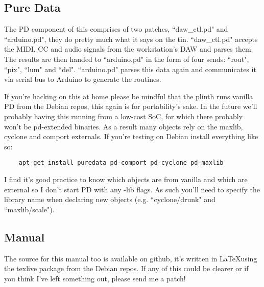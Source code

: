 \documentclass{article}
\begin{document}
	\subsection{Pure Data}
	The PD component of this comprises of two patches, ``daw\_ctl.pd" and 
	``arduino.pd", they do pretty much what it says on the tin. ``daw\_ctl.pd" 
	accepts the MIDI, CC and audio signals from the workstation's DAW and 
	parses them. The results are then handed to ``arduino.pd" in the form of 
	four sends: ``rout", ``pix", ``lum" and ``del". ``arduino.pd" parses this 
	data again and communicates it via serial bus to Arduino to generate the 
	routines.
	
	If you're hacking on this at home please be mindful that the plinth runs 
	vanilla PD from the Debian repos, this again is for portability's sake. In 
	the future we'll probably having this running from a low-cost SoC, for 
	which there probably won't be pd-extended binaries. As a result many 
	objects rely on the maxlib, cyclone and comport externals. If you're 
	testing on Debian install everything like so:
	\begin{verbatim}
	apt-get install puredata pd-comport pd-cyclone pd-maxlib
	\end{verbatim}
	I find it's good practice to know which objects are from vanilla and which 
	are external so I don't start PD with any -lib flags. As such you'll need 
	to specify the library name when declaring new objects (e.g. 
	``cyclone/drunk" and ``maxlib/scale").

	\subsection{Manual}
	The source for this manual too is available on github, it's written in 
	\LaTeX using the texlive package from the Debian repos. If any of this 
	could be clearer or if you think I've left something out, please send me a 
	patch!
\end{document}
